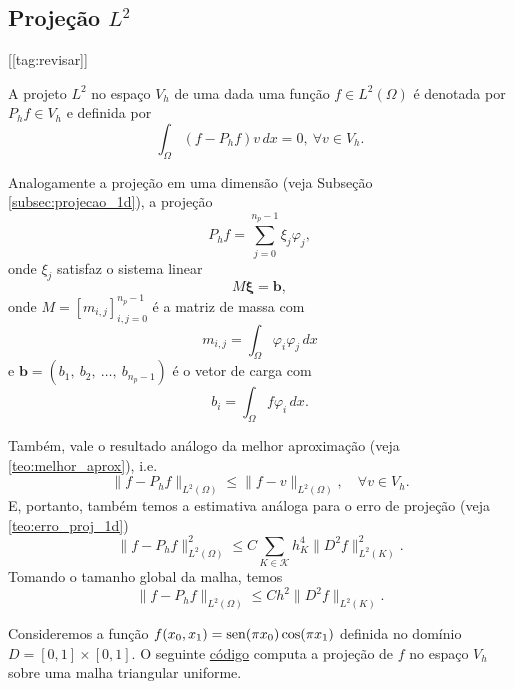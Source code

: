 \subsection{Projeção $L^2$}
[[tag:revisar]]


A projeto $L^2$ no espaço $V_h$ de uma dada uma função $f\in L^2(\Omega)$  é denotada por $P_hf\in V_h$ e definida por
\begin{equation}
  \int_\Omega (f-P_hf)v\,dx = 0,~\forall v\in V_h.
\end{equation}

Analogamente a projeção em uma dimensão (veja Subseção \ref{subsec:projecao_1d}), a projeção
\begin{equation}
  P_h f = \sum_{j=0}^{n_p-1} \xi_j\varphi_j,
\end{equation}
onde $\xi_j$ satisfaz o sistema linear
\begin{equation}
  M\pmb{\xi} = \pmb{b},
\end{equation}
onde $M = [m_{i,j}]_{i,j=0}^{n_p-1}$ é a matriz de massa com
\begin{equation}
  m_{i,j} = \int_{\Omega} \varphi_i\varphi_j\,dx
\end{equation}
e $\pmb{b} = (b_1,~b_2,~\dotsc,~b_{n_p-1})$ é o vetor de carga com
\begin{equation}
  b_i = \int_\Omega f\varphi_i\,dx.
\end{equation}

Também, vale o resultado análogo da melhor aproximação (veja \ref{teo:melhor_aprox}), i.e.
\begin{equation}
  \|f-P_hf\|_{L^2(\Omega)} \leq \|f - v\|_{L^2(\Omega)},\quad\forall v\in V_h.
\end{equation}
E, portanto, também temos a estimativa análoga para o erro de projeção (veja \ref{teo:erro_proj_1d})
\begin{equation}
  \|f-P_hf\|_{L^2(\Omega)}^2 \leq C\sum_{K\in\mathcal{K}} h_K^4\|D^2 f\|_{L^2(K)}^2.
\end{equation}
Tomando o tamanho global da malha, temos
\begin{equation}\label{eq:erro_projec_2d}
  \|f-P_hf\|_{L^2(\Omega)} \leq Ch^2\|D^2 f\|_{L^2(K)}.
\end{equation}

\ifispython
\begin{ex}\label{ex:projec}
Consideremos a função $f(x_0,x_1) = \operatorname{sen}(\pi x_0)\cos(\pi x_1)$ definida no domínio $D = [0, 1]\times [0, 1]$. O seguinte \href{https://github.com/phkonzen/notas/blob/master/src/MetodoElementosFinitos/cap_mef2d/dados/ex_projec/ex_projec.py}{código} computa a projeção de $f$ no espaço $V_h$ sobre uma malha triangular uniforme.


\end{ex}
\fi

